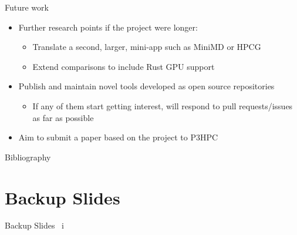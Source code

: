 \documentclass[10pt,aspectratio=169]{beamer}
\begin{document}
\begin{frame}{Future work}
\begin{itemize}
    \item<1-> Further research points if the project were longer:
    \begin{itemize}
        \item Translate a second, larger, mini-app such as MiniMD \cite{osti_1231191} or HPCG \cite{dongarra2015hpcg}
        \item Extend comparisons to include Rust GPU support
    \end{itemize}
    \vspace{1cm}
    \item<2-> \alert{Publish and maintain novel tools developed} as open source repositories
    \begin{itemize}
        \item<3-> If any of them start getting interest, will respond to pull requests/issues as far as possible
    \end{itemize}
    \item<4-> \alert{Aim to submit a paper} based on the project to P3HPC
\end{itemize}
\end{frame}




\appendix

%   
%   

\begin{frame}[allowframebreaks]{Bibliography}
    \printbibliography[heading=none]
\end{frame}

\section{Backup Slides}

\begin{frame}{Backup Slides \ i}
\end{frame}

\end{document}
